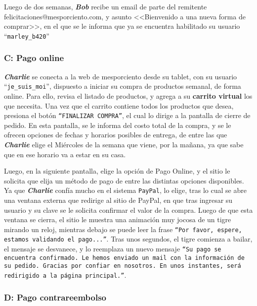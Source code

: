 Luego de dos semanas, \textbf{\emph{Bob}} recibe un email de parte del remitente
felicitaciones@mesporciento.com, y asunto <<Bienvenido a una nueva forma de
comprar>>, en el que se le informa que ya se encuentra habilitado su usuario
``\texttt{marley\_b420}''

\subsubsection{C: Pago online}

\textbf{\emph{Charlie}} se conecta a la web de mesporciento desde su tablet, con
su usuario ``\texttt{je\_suis\_moi}'', dispuesto a iniciar su compra de
productos semanal, de forma online. Para ello, revisa el listado de productos, y
agrega a su \textbf{carrito virtual} los que necesita. Una vez que el carrito
contiene todos los productos que desea, presiona el botón \texttt{``FINALIZAR
COMPRA''}, el cual lo dirige a la pantalla de cierre de pedido. En esta
pantalla, se le informa del costo total de la compra, y se le ofrecen opciones
de fechas y horarios posibles de entrega, de entre las que
\textbf{\emph{Charlie}} elige el Miércoles de la semana que viene, por la
mañana, ya que sabe que en ese horario va a estar en su casa.

Luego, en la siguiente pantalla, elige la opción de Pago Online, y el sitio le
solicita que elija un método de pago de entre las distintas opciones
disponibles. Ya que \textbf{\emph{Charlie}} confía mucho en el sistema
\texttt{PayPal}, lo elige, tras lo cual se abre una ventana externa que redirige
al sitio de PayPal, en que tras ingresar su usuario y su clave se le solicita
confirmar el valor de la compra. Luego de que esta ventana se cierra, el sitio
le muestra una animación muy jocosa de un tigre mirando un reloj, mientras
debajo se puede leer la frase \texttt{``Por favor, espere, estamos validando el
pago...''}. Tras unos segundos, el tigre comienza a bailar, el mensaje se
desvanece, y lo reemplaza un nuevo mensaje \texttt{``Su pago se encuentra
confirmado. Le hemos enviado un mail con la información de su pedido. Gracias
por confiar en nosotros. En unos instantes, será redirigido a la página
principal.''}.

\subsubsection{D: Pago contrareembolso}

